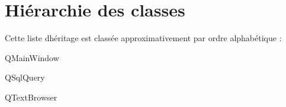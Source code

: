 \section{Hiérarchie des classes}
Cette liste d\textquotesingle{}héritage est classée approximativement par ordre alphabétique \+:\begin{DoxyCompactList}
\item {}
\begin{DoxyCompactList}
\item {}
\end{DoxyCompactList}
\item {}
\item {}
\item Q\+Main\+Window\begin{DoxyCompactList}
\item {}
\end{DoxyCompactList}
\item Q\+Sql\+Query\begin{DoxyCompactList}
\item {}
\end{DoxyCompactList}
\item Q\+Text\+Browser\begin{DoxyCompactList}
\item {}
\end{DoxyCompactList}
\end{DoxyCompactList}
